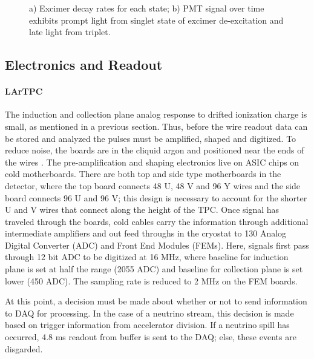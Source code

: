 \documentclass[12pt]{article}
\begin{document}
\begin{figure}[h!]
\centering
{}
\hspace{2 mm}
\caption{ a) Excimer decay rates for each state; b) PMT signal over time exhibits prompt light from singlet state of excimer de-excitation and late light from triplet. } 
\label{fig:light}
\end{figure}

\subsection{Electronics and Readout}
\paragraph{LArTPC}
The induction and collection plane analog response to drifted ionization charge is small, as mentioned in a previous section.  Thus, before the wire readout data can be stored and analyzed the pulses must be amplified, shaped and digitized.  To reduce noise, the boards are in the cliquid argon and positioned near the ends of the wires \cite{bib:uboone_JINST}. The pre-amplification and shaping electronics live on ASIC chips on cold motherboards. There are both top and side type motherboards in the detector, where the top board connects 48 U, 48 V and 96 Y wires and the side board connects 96 U and 96 V; this design is necessary to account for the shorter U and V wires that connect along the height of the TPC. Once signal has traveled through the boards, cold cables carry the information through additional intermediate amplifiers and out feed throughs in the cryostat to 130 Analog Digital Converter (ADC) and Front End Modules (FEMs). Here, signals first pass through 12 bit ADC to be digitized at 16 MHz, where baseline for induction plane is set at half the range (2055 ADC) and baseline for collection plane is set lower (450 ADC). The sampling rate is reduced to 2 MHz on the FEM boards.
\par At this point, a decision must be made about whether or not to send information to DAQ for processing. In the case of a neutrino stream, this decision is made based on trigger information from accelerator division. If a neutrino spill has occurred, 4.8 ms readout from buffer is sent to the DAQ; else, these events are disgarded. 
\end{document}
